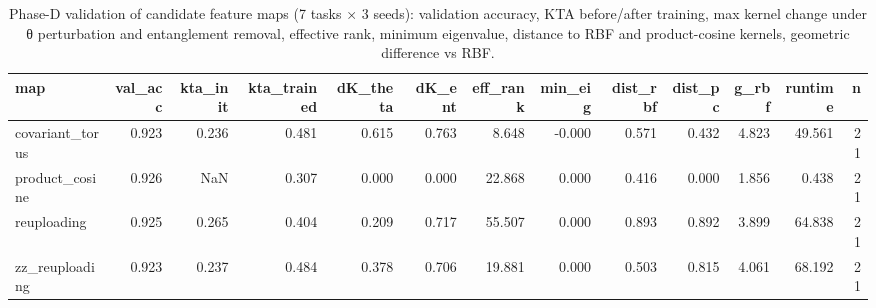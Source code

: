 \begin{table}
\caption{Phase-D validation of candidate feature maps (7 tasks × 3 seeds): validation accuracy, KTA before/after training, max kernel change under θ perturbation and entanglement removal, effective rank, minimum eigenvalue, distance to RBF and product-cosine kernels, geometric difference vs RBF.}
\label{tab:table_validation_maps}
\begin{tabular}{lrrrrrrrrrrrr}
\toprule
map & val\_acc & kta\_init & kta\_trained & dK\_theta & dK\_ent & eff\_rank & min\_eig & dist\_rbf & dist\_pc & g\_rbf & runtime & n \\
\midrule
covariant\_torus & 0.923 & 0.236 & 0.481 & 0.615 & 0.763 & 8.648 & -0.000 & 0.571 & 0.432 & 4.823 & 49.561 & 21 \\
product\_cosine & 0.926 & NaN & 0.307 & 0.000 & 0.000 & 22.868 & 0.000 & 0.416 & 0.000 & 1.856 & 0.438 & 21 \\
reuploading & 0.925 & 0.265 & 0.404 & 0.209 & 0.717 & 55.507 & 0.000 & 0.893 & 0.892 & 3.899 & 64.838 & 21 \\
zz\_reuploading & 0.923 & 0.237 & 0.484 & 0.378 & 0.706 & 19.881 & 0.000 & 0.503 & 0.815 & 4.061 & 68.192 & 21 \\
\bottomrule
\end{tabular}
\end{table}
